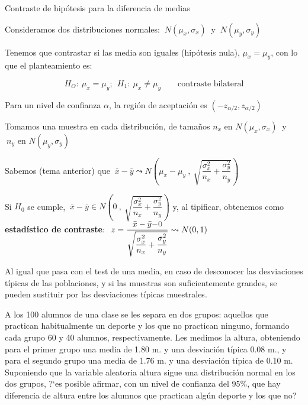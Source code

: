 \begin{myalertblock}{Contraste de hipótesis para la diferencia de medias}

\begin{theorem}
	
\vspace{2mm} Consideramos dos distribuciones normales: $\ N(\mu_x,\sigma_x) \ $ y $\ N(\mu_y,\sigma_y)$

\vspace{2mm} Tenemos que contrastar si las media son iguales (hipótesis nula), $\mu_x = \mu_y$, con lo que el planteamiento es: 

$$H_O:\ \mu_x=\mu_y;\ \ H_1: \ \mu_x \neq \mu_y \qquad \text{contraste bilateral}$$

\vspace{2mm} Para un nivel de confianza $\alpha$, la región de aceptación es $(-z_{\alpha/2},z_{\alpha/2})$

\vspace{2mm} Tomamos una muestra en cada distribución, de tamaños $n_x \text{ en } N(\mu_x,\sigma_x)\ $ y   $\ n_y \text{ en } N(\mu_y,\sigma_y)$ 

\vspace{2mm} Sabemos (tema anterior) que  $\ \bar x - \bar y 	\leadsto N \left( \mu_x-\mu_y \ , \ \sqrt{\dfrac{\sigma^2_x}{n_x}+\dfrac{\sigma_y^2}{n_y}} \right)$

\vspace{2mm} Si $H_0$ se cumple, $\ \bar x - \bar y \in  N \left( 0 \ , \ \sqrt{\dfrac{\sigma^2_x}{n_x}+\dfrac{\sigma_y^2}{n_y}} \right)$ y, al tipificar, obtenemos como \textbf{estadístico de contraste}: $\ z=\dfrac{\bar x - \bar y \textcolor{gris}{- 0}}{\sqrt{\dfrac{\sigma^2_x}{n_x}+\dfrac{\sigma_y^2}{n_y}}} \leadsto N(0,1)$


\vspace{4mm} Al igual que pasa con el test de una media, en caso de desconocer las desviaciones típicas de las poblaciones, y si las muestras son suficientemente grandes, se pueden sustituir por las desviaciones típicas muestrales.
\end{theorem}

\vspace{15mm}
\begin{example}

A los 100 alumnos de una clase se les separa en dos grupos: aquellos que practican habitualmente un deporte y los que no practican ninguno, formando cada grupo 60 y 40 alumnos, respectivamente. Les medimos la altura, obteniendo para el primer grupo una media de 1.80 m. y una desviación típica 0.08 m., y para el segundo grupo una media de 1.76 m. y una desviación típica de 0.10 m. Suponiendo que la variable aleatoria altura sigue una distribución normal en los dos grupos, ?`es posible afirmar, con un nivel de confianza del 95\%, que hay diferencia de altura entre los alumnos que practican algún deporte y los que no?


\end{example}
\end{myalertblock}
